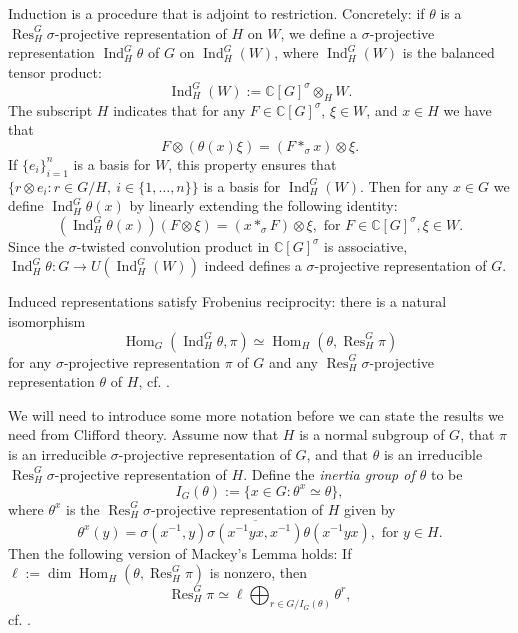 \documentclass[11pt, oneside, reqno]{amsart}
\newcommand{\bbC}{\mathbb{C}}
\newcommand{\Hom}{\operatorname{Hom}}
\newcommand{\Res}{\operatorname{Res}}
\newcommand{\Ind}{\operatorname{Ind}}
\theoremstyle{definition}
\theoremstyle{plain}
\theoremstyle{remark}
\begin{document}
Induction is a procedure that is adjoint to restriction. Concretely: if $\theta$ is a $\Res^G_H\sigma$-projective representation of $H$ on $W$, we define a $\sigma$-projective representation $\Ind_H^G\theta$ of $G$ on $\Ind_H^G(W)$, where $\Ind_H^G(W)$ is the balanced tensor product:
\begin{equation*}
    \Ind_H^G(W) := \bbC[G]^\sigma \otimes_H W.
\end{equation*}
The subscript $H$ indicates that for any $F \in \bbC[G]^\sigma$, $\xi \in W$, and $x \in H$ we have that
\begin{equation*}
    F \otimes (\theta(x) \xi) = (F *_\sigma x) \otimes \xi.
\end{equation*}
If $\{e_i\}_{i = 1}^n$ is a basis for $W$, this property ensures that $\{ r \otimes e_i : r \in G/H, \ i \in \{1,\dots,n\} \}$ is a basis for $\Ind_H^G(W)$.
Then for any $x \in G$ we define $\Ind_H^G\theta(x)$ by linearly extending the following identity:
\begin{equation*}
    (\Ind_H^G\theta(x))(F \otimes \xi) = (x *_\sigma F) \otimes \xi, \text{ for } F \in \bbC[G]^\sigma, \xi \in W.
\end{equation*}
Since the $\sigma$-twisted convolution product in $\bbC[G]^\sigma$ is associative, $\Ind^G_H\theta \colon G \to U(\Ind^G_H(W))$ indeed defines a $\sigma$-projective representation of $G$.

Induced representations satisfy Frobenius reciprocity: there is a natural isomorphism
\begin{equation*}
    \Hom_G(\Ind_H^G\theta ,\pi) \simeq \Hom_H(\theta, \Res^G_H\pi)
\end{equation*}
for any $\sigma$-projective representation $\pi$ of $G$ and any $\Res^G_H\sigma$-projective representation $\theta$ of $H$, cf. \cite[Theorem 8.15]{CeccheriniSilbersteinTullio22}.

We will need to introduce some more notation before we can state the results we need from Clifford theory. Assume now that $H$ is a normal subgroup of $G$, that $\pi$ is an irreducible $\sigma$-projective representation of $G$, and that $\theta$ is an irreducible $\Res^G_H\sigma$-projective representation of $H$. Define the \emph{inertia group of $\theta$} to be
\begin{equation*}
    I_{G}(\theta) := \{ x \in G \colon \theta^x \simeq \theta \},
\end{equation*}
where $\theta^x$ is the $\Res^G_H\sigma$-projective representation of $H$ given by
\begin{equation*}
    \theta^x(y) = \sigma(x^{-1},y) \overline{\sigma(x^{-1}yx,x^{-1})} \theta(x^{-1}yx), \text{ for } y \in H.
\end{equation*}
Then the following version of Mackey's Lemma holds: If $\ell := \dim \Hom_H(\theta,\Res^G_H\pi)$ is nonzero, then
\begin{equation*}
    \Res^G_H\pi \simeq \ell \bigoplus_{r \in G/I_{G}(\theta)} \theta^r,
\end{equation*}
cf. \cite[Theorem 9.7]{CeccheriniSilbersteinTullio22}.
\end{document}
